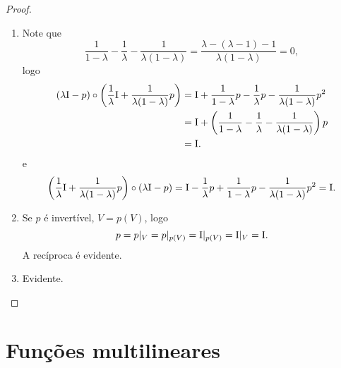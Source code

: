 \begin{proof}
\begin{enumerate}
	\item Note que
		\begin{equation*}
		\frac{1}{1-\lambda} - \frac{1}{\lambda} - \frac{1}{\lambda(1-\lambda)} = \frac{\lambda - (\lambda - 1) - 1}{\lambda(1-\lambda)} = 0,
		\end{equation*}
logo
		\begin{align*}
		(\lambda\mathrm{I} - p) \circ \left( \frac{1}{\lambda}\mathrm{I} + \frac{1}{\lambda(1-\lambda)}p \right) &= \mathrm{I} + \frac{1}{1-\lambda}p - \frac{1}{\lambda}p - \frac{1}{\lambda(1-\lambda)}p^2 \\
			&= \mathrm{I} + \left( \frac{1}{1-\lambda} - \frac{1}{\lambda} - \frac{1}{\lambda(1-\lambda)} \right) p \\
			&= \mathrm{I}.
		\end{align*}
e
	\begin{equation*}
	\left( \frac{1}{\lambda}\mathrm{I} + \frac{1}{\lambda(1-\lambda)}p \right) \circ (\lambda\mathrm{I} - p) = \mathrm{I} - \frac{1}{\lambda}p + \frac{1}{1-\lambda}p - \frac{1}{\lambda(1-\lambda)}p^2 = \mathrm{I}.
	\end{equation*}

	\item Se $p$ é invertível, $V=p(V)$, logo
		\begin{equation*}
		p = p|_{V} = p|_{p(V)} = \mathrm{I}|_{p(V)} = \mathrm{I}|_V = \mathrm{I}.
		\end{equation*}
A recíproca é evidente.

	\item Evidente.

	\end{enumerate}
\end{proof}





\section{Funções multilineares}

